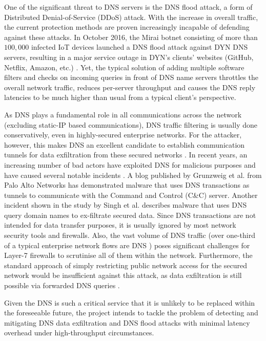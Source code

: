 \documentclass[a4paper]{report}
\begin{document}
One of the significant threat to DNS servers is the DNS flood attack, a form of Distributed Denial-of-Service (DDoS) attack. With the increase in overall traffic, the current protection methods are proven increasingly incapable of defending against these attacks. In October 2016, the Mirai botnet consisting of more than $100,000$ infected IoT devices launched a DNS flood attack against DYN DNS servers, resulting in a major service outage in DYN's clients' websites (GitHub, Netflix, Amazon, etc.) \cite{bisson-2016}. Yet, the typical solution of adding multiple software filters and checks on incoming queries in front of DNS name servers throttles the overall network traffic, reduces per-server throughput and causes the DNS reply latencies to be much higher than usual from a typical client's perspective\cite{Mahjabin-2020}.
 
As DNS plays a fundamental role in all communications across the network (excluding static-IP based communications), DNS traffic filtering is usually done conservatively, even in highly-secured enterprise networks. For the attacker, however, this makes DNS an excellent candidate to establish communication tunnels for data exfiltration from these secured networks \cite{nadler-201936}. In recent years, an increasing number of bad actors have exploited DNS for malicious purposes and have caused several notable incidents \cite{das-8260721}. A blog published by Grunzweig et al.\cite{grunzweig_scott_lee_2018} from Palo Alto Networks has demonstrated malware that uses DNS transactions as tunnels to communicate with the Command and Control (C\&C) server. Another incident shown in the study by Singh et al.\cite{singh-2016} describes malware that uses DNS query domain names to ex-filtrate secured data. Since DNS transactions are not intended for data transfer purposes, it is usually ignored by most network security tools and firewalls. Also, the vast volume of DNS traffic (over one-third of a typical enterprise network flows are DNS \cite{das-8260721}) poses significant challenges for Layer-7 firewalls to scrutinise all of them within the network. Furthermore, the standard approach of simply restricting public network access for the secured network would be insufficient against this attack, as data exfiltration is still possible via forwarded DNS queries \cite{bromberger2011dns}.

Given the DNS is such a critical service that it is unlikely to be replaced within the foreseeable future, the project intends to tackle the problem of detecting and mitigating DNS data exfiltration and DNS flood attacks with minimal latency overhead under high-throughput circumstances.
\end{document}
